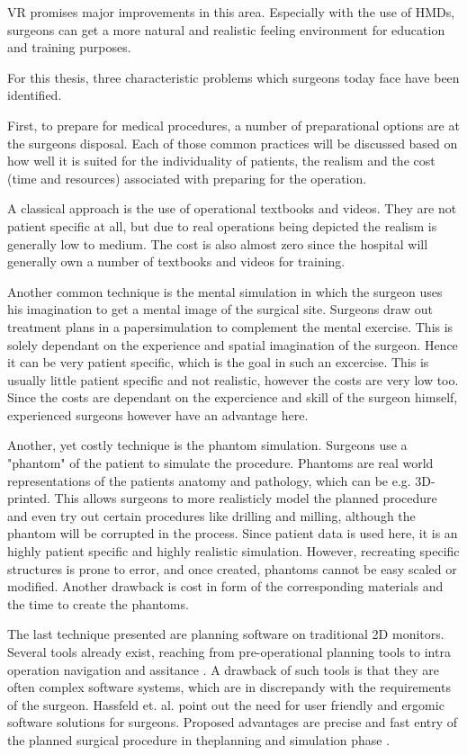 VR promises major improvements in this area.
Especially with the use of HMDs, surgeons can get a more natural and realistic feeling environment for education and training purposes.

For this thesis, three characteristic problems which surgeons today face have been identified.

First, to prepare for medical procedures, a number of preparational options are at the surgeons disposal.
Each of those common practices will be discussed based on how well it is suited for the individuality of patients, the realism and the cost (time and resources) associated with preparing for the operation.

A classical approach is the use of operational textbooks and videos.
They are not patient specific at all, but due to real operations being depicted the realism is generally low to medium.
The cost is also almost zero since the hospital will generally own a number of textbooks and videos for training.

Another common technique is the mental simulation in which the surgeon uses his imagination to get a mental image of the surgical site.
Surgeons draw out treatment plans in a papersimulation to complement the mental exercise.
This is solely dependant on the experience and spatial imagination of the surgeon. 
Hence it can be very patient specific, which is the goal in such an excercise.
This is usually little patient specific and not realistic, however the costs are very low too.
Since the costs are dependant on the expercience and skill of the surgeon himself, experienced surgeons however have an advantage here.

Another, yet costly technique is the phantom simulation.
Surgeons use a "phantom" of the patient to simulate the procedure.
Phantoms are real world representations of the patients anatomy and pathology, which can be e.g. 3D-printed.
This allows surgeons to more realisticly model the planned procedure and even try out certain procedures like drilling and milling, although the phantom will be corrupted in the process.
Since patient data is used here, it is an highly patient specific and highly realistic simulation.
However, recreating specific structures is prone to error, and once created, phantoms cannot be easy scaled or modified.
Another drawback is cost in form of the corresponding materials and the time to create the phantoms.

The last technique presented are planning software on traditional 2D monitors.
Several tools already exist, reaching from pre-operational planning tools to intra operation navigation and assitance \cite{HASSFELD20012}.
A drawback of such tools is that they are often complex software systems, which are in discrepandy with the requirements of the surgeon.
Hassfeld et. al. point out the need for user friendly and ergomic software solutions for surgeons.
Proposed advantages are precise and fast entry of the planned surgical procedure in theplanning and simulation phase \cite{HASSFELD20012}.

